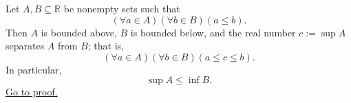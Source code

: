 \begin{theorem}
\label{thm:order-separation-by-supremum}
Let $A,B\subseteq\mathbb{R}$ be nonempty sets such that
\[
  (\forall a\in A)(\forall b\in B)(a\leq b).
\]
Then $A$ is bounded above, $B$ is bounded below, and the real number
$c:=\sup A$ separates $A$ from $B$; that is,
\[
  (\forall a\in A)(\forall b\in B)(a\leq c\leq b).
\]
In particular,
\[
  \sup A\leq\inf B.
\]
\hyperref[prf:order-separation-by-supremum]{Go to proof.}
\end{theorem}